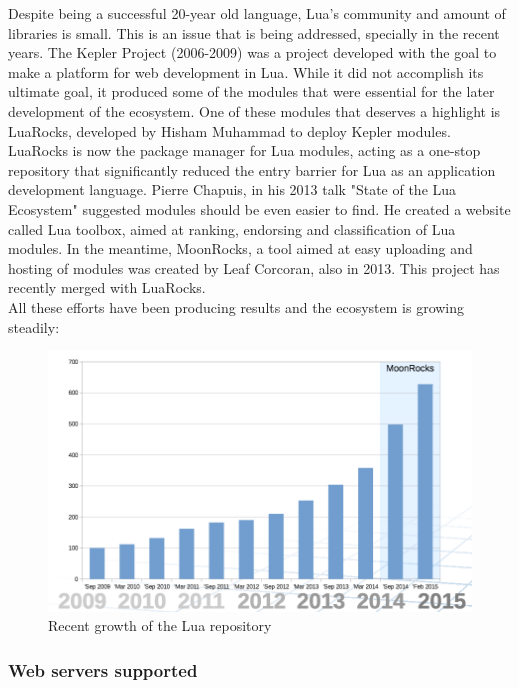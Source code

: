 \documentclass{article}
\begin{document}
Despite being a successful 20-year old language, Lua's community and amount of libraries is small. This is an issue that is being addressed, specially in the recent years. The Kepler Project\autocite{kepler} (2006-2009) was a project developed with the goal to make a platform for web development in Lua\autocite{cgilua}. While it did not accomplish its ultimate goal, it produced some of the modules that were essential for the later development of the ecosystem. One of these modules that deserves a highlight is LuaRocks\autocite{luarocks}, developed by Hisham Muhammad to deploy Kepler modules. LuaRocks is now the package manager for Lua modules, acting as a one-stop repository that significantly reduced the entry barrier for Lua as an application development language. Pierre Chapuis, in his 2013 talk "State of the Lua Ecosystem"\autocite{luaeco} suggested modules should be even easier to find. He created a website called Lua toolbox\autocite{luatoolbox}, aimed at ranking, endorsing and classification of Lua modules. In the meantime, MoonRocks, a tool aimed at easy uploading and hosting of modules\autocite{moonrocks} was created by Leaf Corcoran, also in 2013. This project has recently merged with LuaRocks. \\

All these efforts have been producing results and the ecosystem is growing steadily\autocite{luarockspresentation}: \\
\begin{figure}[h]
\centering\includegraphics[scale=0.5]{luamodules.png}
\caption{\label{fig:luamodules} Recent growth of the Lua repository}
\end{figure}

\subsubsection{Web servers supported}
\end{document}
